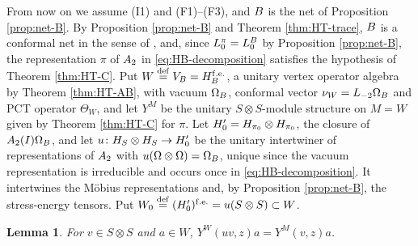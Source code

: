 \documentclass[leqno]{article}
\let\cal\relax
\newcommand{\cal}{\mathcal}
\newcommand{\co}{\colon}
\newcommand{\ot}{\otimes}
\newcommand{\ov}{\overset}
\newtheorem{lemma}[thm]{Lemma}
\numberwithin{equation}{section}
\begin{document}
From now on we assume (I1) and (F1)--(F3), and $\cal B$ is the net of Proposition \ref{prop:net-B}. By Proposition \ref{prop:net-B} and Theorem \ref{thm:HT-trace}, $\cal B$ is a conformal net in the sense of \cite[Definition 2.1 p.~6]{HeT25}, and, since $L_0^\pi = L_0^{\cal B}$ by Proposition \ref{prop:net-B}, the representation $\pi$ of $\cal A_2$ in \eqref{eq:HB-decomposition} satisfies the hypothesis of Theorem \ref{thm:HT-C}. Put $W \ov{\mathrm{def}}{=} V_{\cal B} = \cal H_{\cal B}^{\mathrm{f.e.}}$, a unitary vertex operator algebra by Theorem \ref{thm:HT-AB}, with vacuum $\Omega_{\cal B}$, conformal vector $\nu_W = L_{-2}\Omega_{\cal B}$ and PCT operator $\Theta_W$, and let $Y^M$ be the unitary $S \ot S$-module structure on $M = W$ given by Theorem \ref{thm:HT-C} for $\pi$. Let $\cal H'_0 = \cal H_{\pi_0} \ot \cal H_{\pi_0}$, the closure of $\cal A_2(I)\Omega_{\cal B}$, and let $u \co \cal H_S \ot \cal H_S \to \cal H'_0$ be the unitary intertwiner of representations of $\cal A_2$ with $u(\Omega \ot \Omega) = \Omega_{\cal B}$, unique since the vacuum representation is irreducible and occurs once in \eqref{eq:HB-decomposition}. It intertwines the Möbius representations and, by Proposition \ref{prop:net-B}, the stress-energy tensors. Put $W_0 \ov{\mathrm{def}}{=} (\cal H'_0)^{\mathrm{f.e.}} = u(S \ot S) \subset W$.

\begin{lemma}
\label{lem:naturality}
For $v \in S \ot S$ and $a \in W$, $Y^W(uv,z)a = Y^M(v,z)a$.
\end{lemma}
\end{document}
